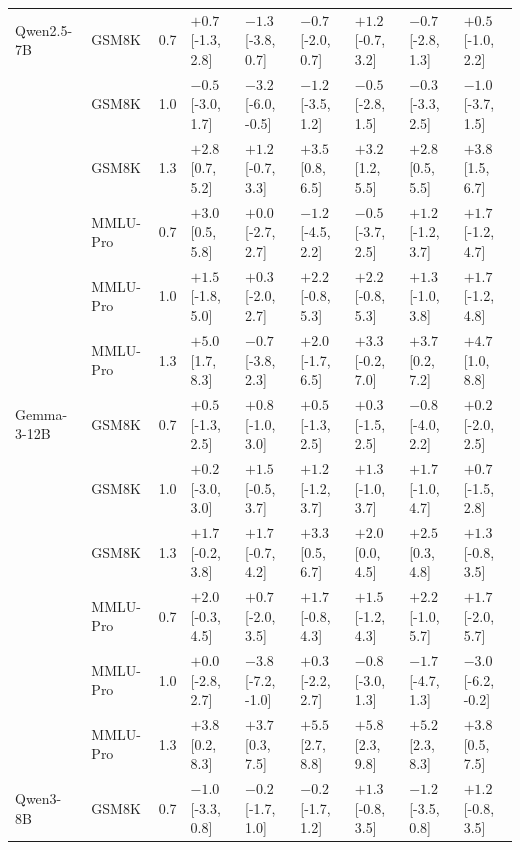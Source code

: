 \begin{tabular}{llcllllll}
\midrule
Qwen2.5-7B & GSM8K & 0.7 & $+0.7$ [-1.3, 2.8] & $-1.3$ [-3.8, 0.7] & $-0.7$ [-2.0, 0.7] & $+1.2$ [-0.7, 3.2] & $-0.7$ [-2.8, 1.3] & $+0.5$ [-1.0, 2.2] \\
 & GSM8K & 1.0 & $-0.5$ [-3.0, 1.7] & $-3.2$ [-6.0, -0.5] & $-1.2$ [-3.5, 1.2] & $-0.5$ [-2.8, 1.5] & $-0.3$ [-3.3, 2.5] & $-1.0$ [-3.7, 1.5] \\
 & GSM8K & 1.3 & $\mathbf{+2.8}$ [0.7, 5.2] & $+1.2$ [-0.7, 3.3] & $\mathbf{+3.5}$ [0.8, 6.5] & $\mathbf{+3.2}$ [1.2, 5.5] & $\mathbf{+2.8}$ [0.5, 5.5] & $\mathbf{+3.8}$ [1.5, 6.7] \\
 & MMLU-Pro & 0.7 & $\mathbf{+3.0}$ [0.5, 5.8] & $+0.0$ [-2.7, 2.7] & $-1.2$ [-4.5, 2.2] & $-0.5$ [-3.7, 2.5] & $+1.2$ [-1.2, 3.7] & $+1.7$ [-1.2, 4.7] \\
 & MMLU-Pro & 1.0 & $+1.5$ [-1.8, 5.0] & $+0.3$ [-2.0, 2.7] & $+2.2$ [-0.8, 5.3] & $+2.2$ [-0.8, 5.3] & $+1.3$ [-1.0, 3.8] & $+1.7$ [-1.2, 4.8] \\
 & MMLU-Pro & 1.3 & $\mathbf{+5.0}$ [1.7, 8.3] & $-0.7$ [-3.8, 2.3] & $+2.0$ [-1.7, 6.5] & $+3.3$ [-0.2, 7.0] & $\mathbf{+3.7}$ [0.2, 7.2] & $\mathbf{+4.7}$ [1.0, 8.8] \\
\midrule
Gemma-3-12B & GSM8K & 0.7 & $+0.5$ [-1.3, 2.5] & $+0.8$ [-1.0, 3.0] & $+0.5$ [-1.3, 2.5] & $+0.3$ [-1.5, 2.5] & $-0.8$ [-4.0, 2.2] & $+0.2$ [-2.0, 2.5] \\
 & GSM8K & 1.0 & $+0.2$ [-3.0, 3.0] & $+1.5$ [-0.5, 3.7] & $+1.2$ [-1.2, 3.7] & $+1.3$ [-1.0, 3.7] & $+1.7$ [-1.0, 4.7] & $+0.7$ [-1.5, 2.8] \\
 & GSM8K & 1.3 & $+1.7$ [-0.2, 3.8] & $+1.7$ [-0.7, 4.2] & $\mathbf{+3.3}$ [0.5, 6.7] & $+2.0$ [0.0, 4.5] & $\mathbf{+2.5}$ [0.3, 4.8] & $+1.3$ [-0.8, 3.5] \\
 & MMLU-Pro & 0.7 & $+2.0$ [-0.3, 4.5] & $+0.7$ [-2.0, 3.5] & $+1.7$ [-0.8, 4.3] & $+1.5$ [-1.2, 4.3] & $+2.2$ [-1.0, 5.7] & $+1.7$ [-2.0, 5.7] \\
 & MMLU-Pro & 1.0 & $+0.0$ [-2.8, 2.7] & $-3.8$ [-7.2, -1.0] & $+0.3$ [-2.2, 2.7] & $-0.8$ [-3.0, 1.3] & $-1.7$ [-4.7, 1.3] & $-3.0$ [-6.2, -0.2] \\
 & MMLU-Pro & 1.3 & $\mathbf{+3.8}$ [0.2, 8.3] & $\mathbf{+3.7}$ [0.3, 7.5] & $\mathbf{+5.5}$ [2.7, 8.8] & $\mathbf{+5.8}$ [2.3, 9.8] & $\mathbf{+5.2}$ [2.3, 8.3] & $\mathbf{+3.8}$ [0.5, 7.5] \\
\midrule
Qwen3-8B & GSM8K & 0.7 & $-1.0$ [-3.3, 0.8] & $-0.2$ [-1.7, 1.0] & $-0.2$ [-1.7, 1.2] & $+1.3$ [-0.8, 3.5] & $-1.2$ [-3.5, 0.8] & $+1.2$ [-0.8, 3.5] \\

\end{tabular}
